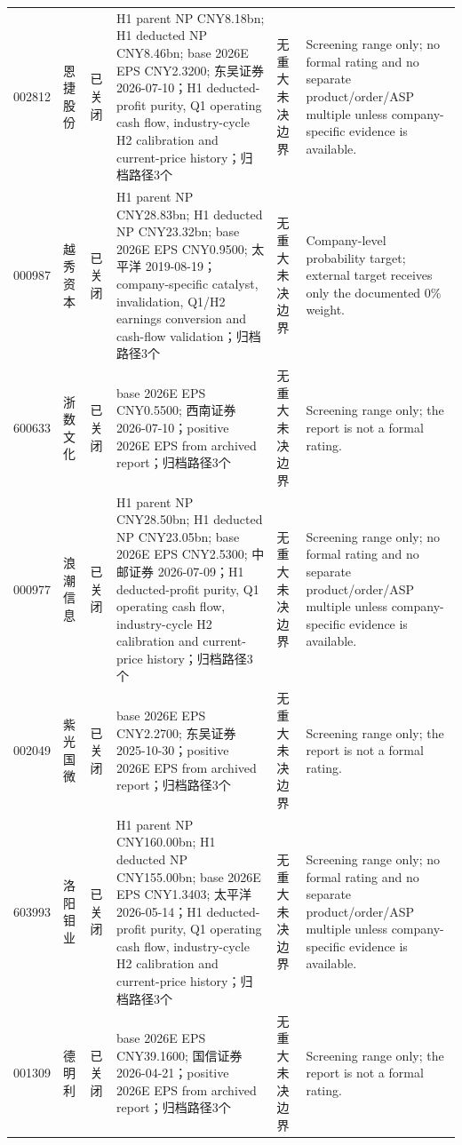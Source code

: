 \begin{longtable}{L{1.00cm}L{1.40cm}L{1.45cm}L{2.85cm}L{2.50cm}L{3.05cm}}
002812 & 恩捷股份 & 已关闭 & H1 parent NP CNY8.18bn; H1 deducted NP CNY8.46bn; base 2026E EPS CNY2.3200; 东吴证券 2026-07-10；H1 deducted-profit purity, Q1 operating cash flow, industry-cycle H2 calibration and current-price history；归档路径3个 & 无重大未决边界 & Screening range only; no formal rating and no separate product/order/ASP multiple unless company-specific evidence is available. \\
000987 & 越秀资本 & 已关闭 & H1 parent NP CNY28.83bn; H1 deducted NP CNY23.32bn; base 2026E EPS CNY0.9500; 太平洋 2019-08-19；company-specific catalyst, invalidation, Q1/H2 earnings conversion and cash-flow validation；归档路径3个 & 无重大未决边界 & Company-level probability target; external target receives only the documented 0\% weight. \\
600633 & 浙数文化 & 已关闭 & base 2026E EPS CNY0.5500; 西南证券 2026-07-10；positive 2026E EPS from archived report；归档路径3个 & 无重大未决边界 & Screening range only; the report is not a formal rating. \\
000977 & 浪潮信息 & 已关闭 & H1 parent NP CNY28.50bn; H1 deducted NP CNY23.05bn; base 2026E EPS CNY2.5300; 中邮证券 2026-07-09；H1 deducted-profit purity, Q1 operating cash flow, industry-cycle H2 calibration and current-price history；归档路径3个 & 无重大未决边界 & Screening range only; no formal rating and no separate product/order/ASP multiple unless company-specific evidence is available. \\
002049 & 紫光国微 & 已关闭 & base 2026E EPS CNY2.2700; 东吴证券 2025-10-30；positive 2026E EPS from archived report；归档路径3个 & 无重大未决边界 & Screening range only; the report is not a formal rating. \\
603993 & 洛阳钼业 & 已关闭 & H1 parent NP CNY160.00bn; H1 deducted NP CNY155.00bn; base 2026E EPS CNY1.3403; 太平洋 2026-05-14；H1 deducted-profit purity, Q1 operating cash flow, industry-cycle H2 calibration and current-price history；归档路径3个 & 无重大未决边界 & Screening range only; no formal rating and no separate product/order/ASP multiple unless company-specific evidence is available. \\
001309 & 德明利 & 已关闭 & base 2026E EPS CNY39.1600; 国信证券 2026-04-21；positive 2026E EPS from archived report；归档路径3个 & 无重大未决边界 & Screening range only; the report is not a formal rating. \\

\end{longtable}
